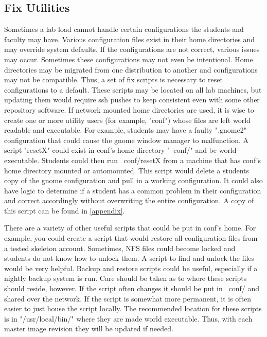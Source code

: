 \subsection{Fix Utilities}
Sometimes a lab load cannot handle certain configurations the students and faculty may have.  Various configuration files exist in their home directories and may override system defaults.  If the configurations are not correct, various issues may occur.  Sometimes these configurations may not even be intentional.  Home directories may be migrated from one distribution to another and configurations may not be compatible.  Thus, a set of fix scripts is necessary to reset configurations to a default.  These scripts may be located on all lab machines, but updating them would require ssh pushes to keep consistent even with some other repository software.  If network mounted home directories are used, it is wise to create one or more utility users (for example, "conf") whose files are left world readable and executable.  For example, students may have a faulty ".gnome2" configuration that could cause the gnome window manager to malfunction.  A script "resetX" could exist in conf's home directory "~conf/" and be world executable.  Students could then run ~conf/resetX from a machine that has conf's home directory mounted or automounted.  This script would delete a students copy of the gnome configuration and pull in a working configuration.  It could also have logic to determine if a student has a common problem in their configuration and correct accordingly without overwriting the entire configuration.  A copy of this script can be found in \ref{appendix}. 

There are a variety of other useful scripts that could be put in conf's home.  For example, you could create a script that would restore all configuration files from a tested skeleton account.  Sometimes, NFS files could become locked and students do not know how to unlock them.  A script to find and unlock the files would be very helpful.  Backup and restore scripts could be useful, especially if a nightly backup system is run.  Care should be taken as to where these scripts should reside, however.  If the script often changes it should be put in ~conf/ and shared over the network.  If the script is somewhat more permanent, it is often easier to just house the script locally.  The recommended location for these scripts is in "/usr/local/bin/" where they are made world executable.  Thus, with each master image revision they will be updated if needed.  
